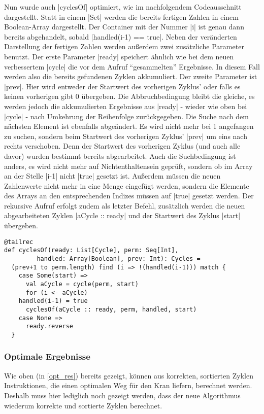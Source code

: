 Nun wurde auch |cyclesOf| optimiert, wie im nachfolgendem Codeausschnitt dargestellt. Statt in einem |Set| werden die bereits fertigen Zahlen in einem Boolean-Array dargestellt.
Der Container mit der Nummer |i| ist genau dann bereits abgehandelt, sobald |handled(i-1) == true|.
Neben der veränderten Darstellung der fertigen Zahlen werden außerdem zwei zusätzliche Parameter benutzt.
Der erste Parameter |ready| speichert ähnlich wie bei dem neuen verbessertem |cycle| die vor dem Aufruf ``gesammelten'' Ergebnisse.
In diesem Fall werden also die bereits gefundenen Zyklen akkumuliert.
Der zweite Parameter ist |prev|. Hier wird entweder der Startwert des vorherigen Zyklus' oder falls es keinen vorherigen gibt 0 übergeben.
Die Abbruchbedingung bleibt die gleiche, es werden jedoch die akkumulierten Ergebnisse aus |ready| - wieder wie oben bei |cycle| - nach Umkehrung der Reihenfolge zurückgegeben.
Die Suche nach dem nächsten Element ist ebenfalls abgeändert.
Es wird nicht mehr bei 1 angefangen zu suchen, sondern beim Startwert des vorherigen Zyklus' |prev| um eins nach rechts verschoben.
Denn der Startwert des vorherigen Zyklus (und auch alle davor) wurden bestimmt bereits abgearbeitet.
Auch die Suchbedingung ist anders, es wird nicht mehr auf Nichtenthaltensein geprüft, sondern ob im Array an der Stelle |i-1| nicht |true| gesetzt ist.
Außerdem müssen die neuen Zahlenwerte nicht mehr in eine Menge eingefügt werden, sondern die Elemente des Arrays an den entsprechenden Indizes müssen auf |true| gesetzt werden.
Der rekursive Aufruf erfolgt zudem als letzter Befehl,
zusätzlich werden die neuen abgearbeiteten Zyklen |aCycle :: ready| und der Startwert des Zyklus |start| übergeben.
\begin{lstlisting}
@tailrec
def cyclesOf(ready: List[Cycle], perm: Seq[Int],
	     handled: Array[Boolean], prev: Int): Cycles =
  (prev+1 to perm.length) find (i => !(handled(i-1))) match {
    case Some(start) =>
      val aCycle = cycle(perm, start)
      for (i <- aCycle)
	handled(i-1) = true
      cyclesOf(aCycle :: ready, perm, handled, start)
    case None =>
      ready.reverse
  }
\end{lstlisting}

\subsubsection{Optimale Ergebnisse}
Wie oben (in \ref{opt_res}) bereits gezeigt, können aus korrekten, sortierten Zyklen Instruktionen, die einen optimalen Weg für den Kran liefern, berechnet werden.
Deshalb muss hier lediglich noch gezeigt werden, dass der neue Algorithmus wiederum korrekte und sortierte Zyklen berechnet. 

